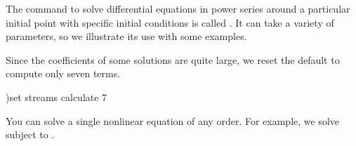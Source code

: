 {{{{{{{{{{{{{{{{The command to solve differential equations in power
series
around
a particular initial point with specific initial conditions is called
.
It can take a variety of parameters, so we illustrate
its use with some examples.

\begin{noOutputXtc}
\begin{xtccomment}
Since the coefficients of some solutions
are quite large, we reset the default to compute only seven terms.
\end{xtccomment}
\begin{spadsrc}
)set streams calculate 7 
\end{spadsrc}
\end{noOutputXtc}

You can solve a single nonlinear equation of any order. For example,
we solve  
subject to .

}}}}}}}}}}}}}}}}
